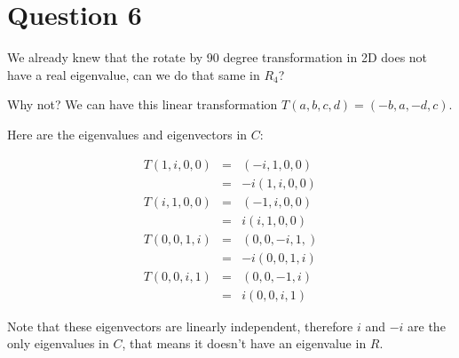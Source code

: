 \section*{Question 6}
We already knew that the rotate by 90 degree transformation in 2D does not have a real eigenvalue, can we do that same in $ R_4 $?

Why not? We can have this linear transformation $ T(a,b,c,d) = (-b,a,-d,c) $.

Here are the eigenvalues and eigenvectors in $ C $:

\begin{eqnarray*}
  T(1,i,0,0) &=& (-i,1,0,0)  \\
             &=& -i(1,i,0,0) \\
  T(i,1,0,0) &=& (-1,i,0,0)  \\
             &=& i(i,1,0,0)  \\
  T(0,0,1,i) &=& (0,0,-i,1,) \\
             &=& -i(0,0,1,i) \\
  T(0,0,i,1) &=& (0,0,-1,i)  \\
             &=& i(0,0,i,1)
\end{eqnarray*}

Note that these eigenvectors are linearly independent, therefore $ i $ and $ -i $ are the only eigenvalues in $ C $, that means it doesn't have an eigenvalue in $ R $.